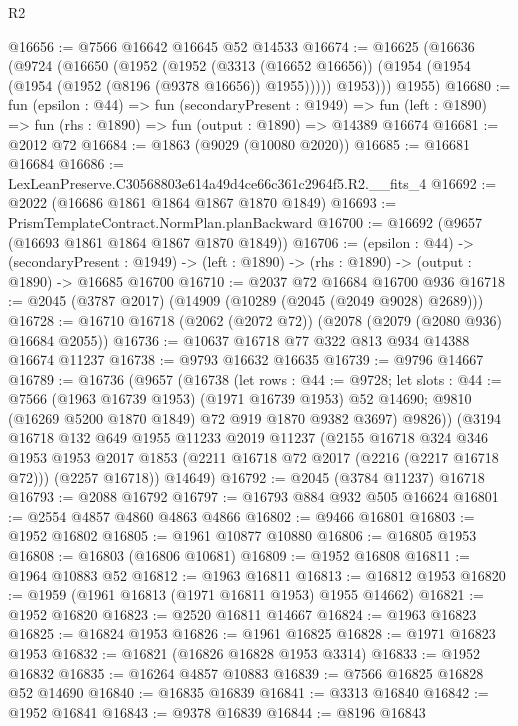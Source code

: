 \begin{lexlean}{R2}
\begin{coremodule}
@16656 := @7566 @16642 @16645 @52 @14533
@16674 := @16625
    (@16636
      (@9724
        (@16650
          (@1952
            (@1952
              (@3313 (@16652 @16656))
              (@1954 (@1954 (@1954 (@1952 (@8196 (@9378 @16656)) @1955)))))
            @1953)))
      @1955)
@16680 := fun (epsilon : @44) =>
  fun (secondaryPresent : @1949) =>
  fun (left : @1890) => fun (rhs : @1890) => fun (output : @1890) => @14389 @16674
@16681 := @2012 @72
@16684 := @1863 (@9029 (@10080 @2020))
@16685 := @16681 @16684
@16686 := LexLeanPreserve.C30568803e614a49d4ce66c361c2964f5.R2.__fits_4
@16692 := @2022 (@16686 @1861 @1864 @1867 @1870 @1849)
@16693 := PrismTemplateContract.NormPlan.planBackward
@16700 := @16692 (@9657 (@16693 @1861 @1864 @1867 @1870 @1849))
@16706 := (epsilon : @44) ->
  (secondaryPresent : @1949) -> (left : @1890) -> (rhs : @1890) -> (output : @1890) -> @16685 @16700
@16710 := @2037 @72 @16684 @16700 @936
@16718 := @2045 (@3787 @2017) (@14909 (@10289 (@2045 (@2049 @9028) @2689)))
@16728 := @16710 @16718 (@2062 (@2072 @72)) (@2078 (@2079 (@2080 @936) @16684 @2055))
@16736 := @10637 @16718 @77 @322 @813 @934 @14388 @16674 @11237
@16738 := @9793 @16632 @16635
@16739 := @9796 @14667
@16789 := @16736
    (@9657
      (@16738
        (let rows : @44 := @9728;
        let slots : @44 := @7566 (@1963 @16739 @1953) (@1971 @16739 @1953) @52 @14690;
        @9810 (@16269 @5200 @1870 @1849) @72 @919 @1870 @9382 @3697)
        @9826))
    (@3194
      @16718
      @132
      @649
      @1955
      @11233
      @2019
      @11237
      (@2155
        @16718
        @324
        @346
        @1953
        @1953
        @2017
        @1853
        (@2211 @16718 @72 @2017 (@2216 (@2217 @16718 @72)))
        (@2257 @16718))
      @14649)
@16792 := @2045 (@3784 @11237) @16718
@16793 := @2088 @16792
@16797 := @16793 @884 @932 @505 @16624
@16801 := @2554 @4857 @4860 @4863 @4866
@16802 := @9466 @16801
@16803 := @1952 @16802
@16805 := @1961 @10877 @10880
@16806 := @16805 @1953
@16808 := @16803 (@16806 @10681)
@16809 := @1952 @16808
@16811 := @1964 @10883 @52
@16812 := @1963 @16811
@16813 := @16812 @1953
@16820 := @1959 (@1961 @16813 (@1971 @16811 @1953) @1955 @14662)
@16821 := @1952 @16820
@16823 := @2520 @16811 @14667
@16824 := @1963 @16823
@16825 := @16824 @1953
@16826 := @1961 @16825
@16828 := @1971 @16823 @1953
@16832 := @16821 (@16826 @16828 @1953 @3314)
@16833 := @1952 @16832
@16835 := @16264 @4857 @10883
@16839 := @7566 @16825 @16828 @52 @14690
@16840 := @16835 @16839
@16841 := @3313 @16840
@16842 := @1952 @16841
@16843 := @9378 @16839
@16844 := @8196 @16843

\end{coremodule}
\end{lexlean}
